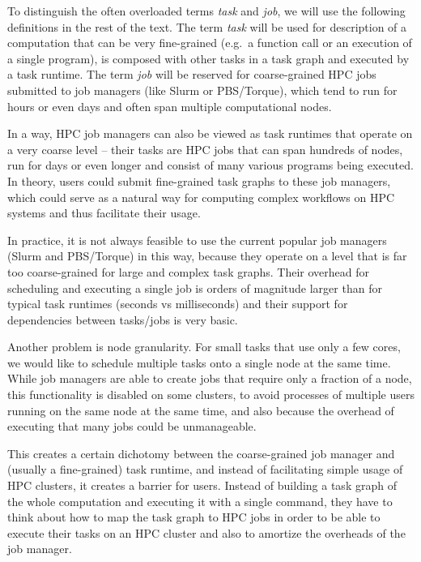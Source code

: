 To distinguish the often overloaded terms \emph{task} and \emph{job}, we will use the following
definitions in the rest of the text. The term \emph{task} will be used for description of a
computation that can be very fine-grained (e.g.\ a function call or an execution of a single
program), is composed with other tasks in a task graph and executed by a task runtime. The term
\emph{job} will be reserved for coarse-grained HPC jobs submitted to job managers (like Slurm or
PBS/Torque), which tend to run for hours or even days and often span multiple computational nodes.

In a way, HPC job managers can also be viewed as task runtimes that operate on a very coarse
level -- their tasks are HPC jobs that can span hundreds of nodes, run for days or even longer and
consist of many various programs being executed. In theory, users could submit fine-grained task
graphs to these job managers, which could serve as a natural way for computing complex workflows on
HPC systems and thus facilitate their usage.

In practice, it is not always feasible to use the current popular job managers (Slurm and
PBS/Torque) in this way, because they operate on a level that is far too coarse-grained for large
and complex task graphs. Their overhead for scheduling and executing a single job is orders of
magnitude larger than for typical task runtimes (seconds vs milliseconds) and their support for
dependencies between tasks/jobs is very basic.

Another problem is node granularity. For small tasks that use only a few cores, we would like to
schedule multiple tasks onto a single node at the same time. While job managers are able to create
jobs that require only a fraction of a node, this functionality is disabled on some
clusters,
to avoid processes of multiple users running on the same node at the same time, and also because the
overhead of executing that many jobs could be unmanageable.

This creates a certain dichotomy between the coarse-grained job manager and (usually a
fine-grained) task runtime, and instead of facilitating simple usage of HPC clusters, it creates a
barrier for users. Instead of building a task graph of the whole computation and executing it with
a single command, they have to think about how to map the task graph to HPC jobs in order to be
able to execute their tasks on an HPC cluster and also to amortize the overheads of the job
manager.

